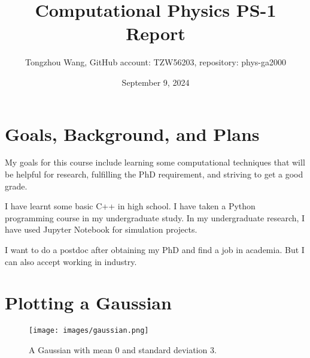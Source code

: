 \documentclass[11pt]{article}
\title{Computational Physics PS-1 Report}
\author{Tongzhou Wang, GitHub account: TZW56203, repository: phys-ga2000}
\date{September 9, 2024}
\begin{document}
\maketitle


\section{Goals, Background, and Plans}
\label{sec:intro}
My goals for this course include learning some computational techniques that will be helpful for research, fulfilling the PhD requirement, and striving to get a good grade.

I have learnt some basic C++ in high school. I have taken a Python programming course in my undergraduate study. In my undergraduate research, I have used Jupyter Notebook for simulation projects.

I want to do a postdoc after obtaining my PhD and find a job in academia. But I can also accept working in industry.

\section{Plotting a Gaussian}
\label{sec:methods}

\begin{figure}[H]
    \centering
    \texttt{[image: images/gaussian.png]}
    \caption{A Gaussian with mean 0 and standard deviation 3.}
    \label{fig:gaussian}
\end{figure}
\end{document}
